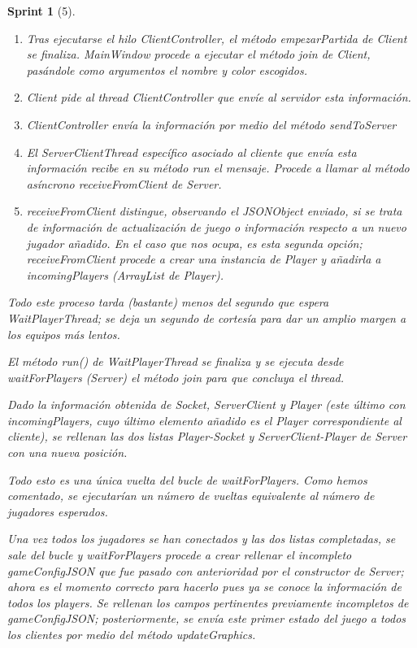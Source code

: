 \documentclass{article}
\theoremstyle{break}
\newtheorem*{sprint}{Sprint}
\begin{document}
\begin{sprint}[5]
\begin{enumerate}
\item Tras ejecutarse el hilo ClientController, el método empezarPartida de Client se finaliza. MainWindow procede a ejecutar el método join de Client, pasándole como argumentos el nombre y color escogidos.
\item Client pide al thread ClientController que envíe al servidor esta información.
\item ClientController envía la información por medio del método sendToServer
\item El ServerClientThread específico asociado al cliente que envía esta información recibe en su método run el mensaje. Procede a llamar al método asíncrono receiveFromClient de Server.
\item receiveFromClient distingue, observando el JSONObject enviado, si se trata de información de actualización de juego o información respecto a un nuevo jugador añadido. En el caso que nos ocupa, es esta segunda opción; receiveFromClient procede a crear una instancia de Player y añadirla a incomingPlayers (ArrayList de Player).
\end{enumerate}

Todo este proceso tarda (bastante) menos del segundo que espera WaitPlayerThread; se deja un segundo de cortesía para dar un amplio margen a los equipos más lentos.

El método run() de WaitPlayerThread se finaliza y se ejecuta desde waitForPlayers (Server) el método join para que concluya el thread.

Dado la información obtenida de Socket, ServerClient y Player (este último con incomingPlayers, cuyo último elemento añadido es el Player correspondiente al cliente), se rellenan las dos listas Player-Socket y ServerClient-Player de Server con una nueva posición.

Todo esto es una única vuelta del bucle de waitForPlayers. Como hemos comentado, se ejecutarían un número de vueltas equivalente al número de jugadores esperados.

Una vez todos los jugadores se han conectados y las dos listas completadas, se sale del bucle y waitForPlayers procede a crear rellenar el incompleto gameConfigJSON que fue pasado con anterioridad por el constructor de Server; ahora es el momento correcto para hacerlo pues ya se conoce la información de todos los players. Se rellenan los campos pertinentes previamente incompletos de gameConfigJSON; posteriormente, se envía este primer estado del juego a todos los clientes por medio del método updateGraphics.


\end{sprint}
\end{document}
